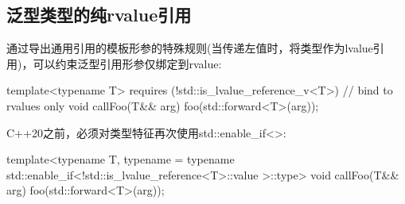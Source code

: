\subsection{泛型类型的纯rvalue引用}

通过导出通用引用的模板形参的特殊规则(当传递左值时，将类型作为lvalue引用)，可以约束泛型引用形参仅绑定到rvalue:

\begin{cppcode}
template<typename T>
requires (!std::is_lvalue_reference_v<T>) // bind to rvalues only
void callFoo(T&& arg) {
	foo(std::forward<T>(arg));
}
\end{cppcode}

C++20之前，必须对类型特征再次使用std::enable_if<>:

\begin{cppcode}
template<typename T,
	typename
		= typename std::enable_if<!std::is_lvalue_reference<T>::value
			>::type>
void callFoo(T&& arg) {
	foo(std::forward<T>(arg));
}
\end{cppcode}


